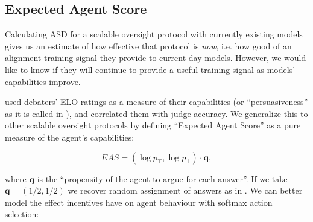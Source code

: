 



\subsection{Expected Agent Score}
\label{solib:sec:eas}

Calculating ASD for a scalable oversight protocol with currently existing models gives us an estimate of how effective that protocol is \emph{now}, i.e. how good of an alignment training signal they provide to current-day models. However, we would like to know if they will continue to provide a useful training signal as models' capabilities improve.

\Previouswork{} used debaters' ELO ratings as a measure of their capabilities (or ``persuasiveness'' as it is called in \citet{khanDebatingMorePersuasive2024}), and correlated them with judge accuracy. We generalize this to other scalable oversight protocols by defining ``Expected Agent Score'' as a pure measure of the agent's capabilities:

\[EAS=(\log p_\top,\log p_\bot)\cdot\mathbf{q},\]

where $\mathbf{q}$ is the ``propensity of the agent to argue for each answer''. If we take $\mathbf{q}=(1/2,1/2)$ we recover random assignment of answers as in \previouswork{}. We can better model the effect incentives have on agent behaviour with softmax action selection:

